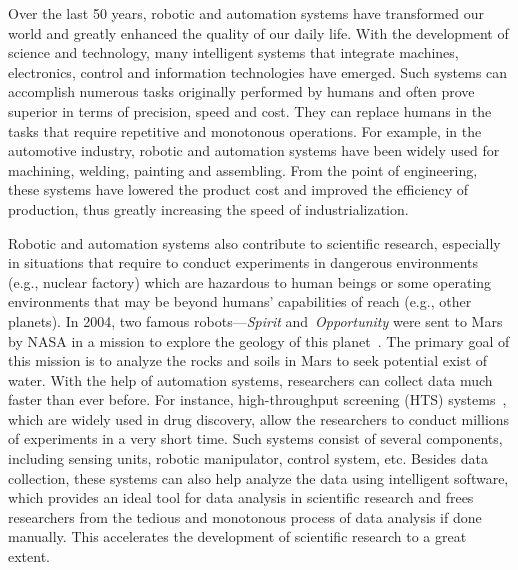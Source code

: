Over the last 50 years, robotic and automation systems have transformed our world and greatly enhanced the quality of our daily life. With the development of science and technology, many intelligent systems that integrate machines, electronics, control and information technologies have emerged. Such systems can accomplish numerous tasks originally performed by humans and often prove superior in terms of precision, speed and cost. They can replace humans in the tasks that require repetitive and monotonous operations. For example, in the automotive industry, robotic and automation systems have been widely used for machining, welding, painting and assembling. From the point of engineering, these systems have lowered the product cost and improved the efficiency of production, thus greatly increasing the speed of industrialization. 

Robotic and automation systems also contribute to scientific research, especially in situations that require to conduct experiments in dangerous environments (e.g., nuclear factory) which are hazardous to human beings or some operating environments that may be beyond humans' capabilities of reach (e.g., other planets). In 2004, two famous robots---\textit{Spirit} and~\textit{Opportunity} were sent to Mars by NASA in a mission to explore the geology of this planet~\cite{Grotzinger:Sci:2014}. The primary goal of this mission is to analyze the rocks and soils in Mars to seek potential exist of water. With the help of automation systems, researchers can collect data much faster than ever before. For instance, high-throughput screening (HTS) systems~\cite{Hertzberg2000}, which are widely used in drug discovery, allow the researchers to conduct millions of experiments in a very short time. Such systems consist of several components, including sensing units, robotic manipulator, control system, etc. Besides data collection, these systems can also help analyze the data using intelligent software, which provides an ideal tool for data analysis in scientific research and frees researchers from the tedious and monotonous process of data analysis if done manually. This accelerates the development of scientific research to a great extent. 

